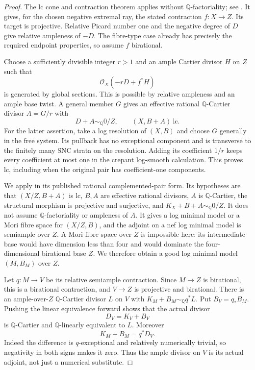 \begin{proof}
The lc cone and contraction theorem applies without
$\mathbb Q$-factoriality; see
\cite[Theorem~1.1]{FujinoFoundations}.  It gives, for the chosen
negative extremal ray, the stated contraction $f:X\to Z$.
Its target is projective.  Relative Picard number one and the
negative degree of $D$ give relative ampleness of $-D$.
The fibre-type case already has precisely the required endpoint
properties, so assume $f$ birational.

Choose a sufficiently divisible integer $r>1$ and an ample
Cartier divisor $H$ on $Z$ such that
\[
 \mathcal O_X(-rD+f^*H)
\]
is generated by global sections.  This is possible by relative
ampleness and an ample base twist.  A general member $G$ gives
an effective rational $\mathbb Q$-Cartier divisor $A=G/r$ with
\[
 D+A\sim_{\mathbb Q}0/Z,
 \qquad (X,B+A)\ \text{lc}.
\]
For the latter assertion, take a log resolution of $(X,B)$ and
choose $G$ generally in the free system.  Its pullback has no
exceptional component and is transverse to the finitely many
SNC strata on the resolution.  Adding its coefficient $1/r$
keeps every coefficient at most one in the crepant log-smooth
calculation.  This proves lc, including when the original pair
has coefficient-one components.

We apply \cite[Theorem~1.1(1)--(2)]{BirkarLC} in its published
rational complemented-pair form.  Its hypotheses are that
$(X/Z,B+A)$ is lc, $B,A$ are effective rational divisors, $A$ is
$\mathbb Q$-Cartier, the structural morphism is projective and
surjective, and $K_X+B+A\sim_{\mathbb Q}0/Z$.  It does not assume
$\mathbb Q$-factoriality or ampleness of $A$.  It gives a log
minimal model or a Mori fibre space for $(X/Z,B)$, and the
adjoint on a nef log minimal model is semiample over $Z$.
A Mori fibre space over $Z$ is impossible here: its intermediate
base would have dimension less than four and would dominate the
four-dimensional birational base $Z$.  We therefore obtain a
good log minimal model $(M,B_M)$ over $Z$.

Let $q:M\to V$ be its relative semiample contraction.  Since
$M\to Z$ is birational, this is a birational contraction, and
$V\to Z$ is projective and birational.  There is an ample-over-$Z$
$\mathbb Q$-Cartier divisor $L$ on $V$ with
$K_M+B_M\sim_{\mathbb Q}q^*L$.  Put $B_V=q_*B_M$.  Pushing the
linear equivalence forward shows that the actual divisor
\[
 D_V=K_V+B_V
\]
is $\mathbb Q$-Cartier and $\mathbb Q$-linearly equivalent to $L$.
Moreover
\[
 K_M+B_M=q^*D_V.
\]
Indeed the difference is $q$-exceptional and relatively
numerically trivial, so negativity in both signs makes it zero.
Thus the ample divisor on $V$ is its actual adjoint, not just a
numerical substitute.


\end{proof}
